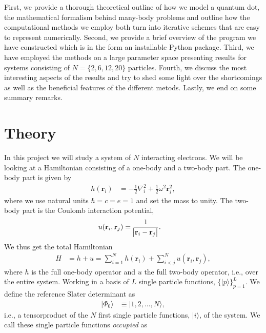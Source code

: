 \documentclass[
    a4paper, aps, twocolumn, floatfix, superscriptaddress,
    nofootinbib]{revtex4-1}
\newcommand{\vf}{\mathbf}
\newcommand{\1}{\mathds{1}}
\newcommand{\half}{\frac{1}{2}}
\newcommand{\ket}[1]{\rvert #1\rangle}
\begin{document}
    First, we provide a thorough theoretical outline of how we model a quantum
    dot, the mathematical formalism behind many-body problems and outline how
    the computational methods we employ both turn into iterative schemes that
    are easy to represent numerically. Second, we provide a brief overview of
    the program we have constructed which is in the form an installable Python
    package.  Third, we have employed the methods on a large parameter space
    presenting results for systems consisting of $N= \{2, 6, 12, 20\}$
    particles. Fourth, we discuss the most interesting aspects of the results
    and try to shed some light over the shortcomings as well as the beneficial
    features of the different metods. Lastly, we end on some summary remarks.

\section{Theory}
    In this project we will study a system of $N$ interacting electrons. We will
    be looking at a Hamiltonian consisting of a one-body and a two-body part.
    The one-body part is given by
    \begin{align}
        h(\vf{r}_i)
        &= -\half\nabla_i^2 + \half\omega^2 \vf{r}_i^2,
        \label{eq:one_body_hamiltonian}
    \end{align}
    where we use natural units $\hbar = c = e = 1$ and set the mass to unity.
    The two-body part is the Coulomb interaction potential,
    \begin{align}
        u(\vf{r}_i, \vf{r}_j)
        &= \frac{1}{\abs{\vf{r}_i - \vf{r}_j}}.
        \label{eq:two_body_operator}
    \end{align}
    We thus get the total Hamiltonian
    \begin{align}
        H &= h + u
        =
        \sum_{i = 1}^N h(\vf{r}_i) + \sum_{i < j}^N u(\vf{r}_i, \vf{r}_j),
    \end{align}
    where $h$ is the full one-body operator and $u$ the full two-body
    operator, i.e., over the entire system.  Working in a basis of $L$ single
    particle functions, $\{\ket{p}\}_{p = 1}^L$. We define the reference Slater
    determinant as
    \begin{align}
        \ket{\Phi_0} &\equiv \ket{1, 2, \dots, N},
    \end{align}
    i.e., a tensorproduct of the $N$ first single particle functions, $\ket{i}$,
    of the system. We call these single particle functions \emph{occupied} as
\end{document}
